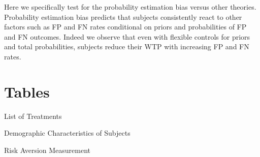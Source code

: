 \documentclass[12pt,a4paper]{article}
\begin{document}
Here we specifically test for the probability estimation bias versus other theories. Probability estimation bias predicts that subjects consistently react to other factors such as FP and FN rates conditional on priors and probabilities of FP and FN outcomes. Indeed we observe that even with flexible controls for priors and total probabilities, subjects reduce their WTP with increasing FP and FN rates.  


\newpage
\singlespacing
\small




 
\appendix

\newpage
\section{Tables}

\begin{table}[h!]
\caption{List of Treatments} \label{treaments_tab}

\end{table}

\begin{table}[h!]
\caption{Demographic Characteristics of Subjects} \label{summ_tab}

\end{table}

\begin{table}[h!]
\caption{Risk Aversion Measurement} \label{ra_tab}

\end{table}

 \label{main_wtp_tab}



 \label{het_wtp_tab}
\end{document}
